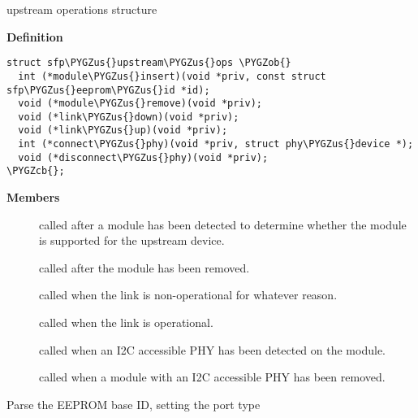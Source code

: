 \documentclass[a4paper,8pt,english]{sphinxmanual}
\def\PYGZus{\char`\_}
\def\PYGZob{\char`\{}
\def\PYGZcb{\char`\}}
\begin{document}
\begin{fulllineitems}
\label{networking/kapi:c.sfp_upstream_ops}
upstream operations structure

\end{fulllineitems}


\textbf{Definition}

\begin{Verbatim}[commandchars=\\\{\}]
struct sfp\PYGZus{}upstream\PYGZus{}ops \PYGZob{}
  int (*module\PYGZus{}insert)(void *priv, const struct sfp\PYGZus{}eeprom\PYGZus{}id *id);
  void (*module\PYGZus{}remove)(void *priv);
  void (*link\PYGZus{}down)(void *priv);
  void (*link\PYGZus{}up)(void *priv);
  int (*connect\PYGZus{}phy)(void *priv, struct phy\PYGZus{}device *);
  void (*disconnect\PYGZus{}phy)(void *priv);
\PYGZcb{};
\end{Verbatim}

\textbf{Members}
\begin{description}
\item[{}] \leavevmode
called after a module has been detected to determine
whether the module is supported for the upstream device.

\item[{}] \leavevmode
called after the module has been removed.

\item[{}] \leavevmode
called when the link is non-operational for whatever
reason.

\item[{}] \leavevmode
called when the link is operational.

\item[{}] \leavevmode
called when an I2C accessible PHY has been detected
on the module.

\item[{}] \leavevmode
called when a module with an I2C accessible PHY has
been removed.

\end{description}

\begin{fulllineitems}
\label{networking/kapi:c.sfp_parse_port}
Parse the EEPROM base ID, setting the port type

\end{fulllineitems}
\end{document}

